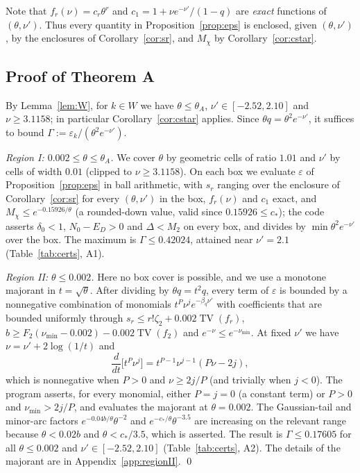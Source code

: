 \documentclass[11pt]{amsart}
\theoremstyle{definition}
\theoremstyle{remark}
\numberwithin{equation}{section}
\newcommand{\TV}{\operatorname{TV}}
\begin{document}
Note that $f_r(\nu)=c_r\theta^r$ and $c_1=1+\nu e^{-\nu'}/(1-q)$ are \emph{exact} functions of $(\theta,\nu')$. Thus every quantity in
Proposition~\ref{prop:eps} is enclosed, given $(\theta,\nu')$, by the enclosures of Corollary~\ref{cor:sr}, and $M_\chi$ by
Corollary~\ref{cor:cstar}.

\subsection{Proof of Theorem A}\label{sec:proofA}
By Lemma~\ref{lem:W}, for $k\in W$ we have $\theta\le\theta_A$, $\nu'\in[-2.52,2.10]$ and $\nu\ge3.1158$; in particular
Corollary~\ref{cor:cstar} applies. Since $\theta q=\theta^2e^{-\nu'}$, it suffices to bound $\Gamma:=\varepsilon_k/(\theta^2e^{-\nu'})$.

\emph{Region I: $0.002\le\theta\le\theta_A$.} We cover $\theta$ by geometric cells of ratio $1.01$ and $\nu'$ by cells of width $0.01$
(clipped to $\nu\ge3.1158$). On each box we evaluate $\varepsilon$ of Proposition~\ref{prop:eps} in ball arithmetic, with $s_r$ ranging over
the enclosure of Corollary~\ref{cor:sr} for every $(\theta,\nu')$ in the box, $f_r(\nu)$ and $c_1$ exact, and
$M_\chi\le e^{-0.15926/\theta}$ (a rounded-down value, valid since $0.15926\le c_\ast$); the code asserts $\delta_0<1$, $N_0-E_D>0$ and $\Delta<M_2$ on every box, and divides by
$\min\theta^2e^{-\nu'}$ over the box. The maximum is $\Gamma\le0.42024$, attained near $\nu'=2.1$ (Table~\ref{tab:certs}, A1).

\emph{Region II: $\theta\le0.002$.} Here no box cover is possible, and we use a monotone majorant in $t=\sqrt\theta$. After dividing by
$\theta q=t^2q$, every term of $\varepsilon$ is bounded by a nonnegative combination of monomials $t^P\nu^je^{-\beta_q\nu'}$ with
coefficients that are bounded uniformly through $s_r\le r!\zeta_2+0.002\TV(f_r)$, $b\ge F_2(\nu_{\min}-0.002)-0.002\TV(f_2)$ and
$e^{-\nu}\le e^{-\nu_{\min}}$. At fixed $\nu'$ we have $\nu=\nu'+2\log(1/t)$ and
\[
  \frac{d}{dt}\bigl[t^P\nu^j\bigr]=t^{P-1}\nu^{j-1}(P\nu-2j),
\]
which is nonnegative when $P>0$ and $\nu\ge2j/P$ (and trivially when $j<0$). The program asserts, for every
monomial, either $P=j=0$ (a constant term) or $P>0$ and $\nu_{\min}>2j/P$, and evaluates the majorant at $\theta=0.002$. The Gaussian-tail and minor-arc factors $e^{-0.04b/\theta}\theta^{-2}$ and
$e^{-c_\ast/\theta}\theta^{-3.5}$ are increasing on the relevant range because $\theta<0.02b$ and $\theta<c_\ast/3.5$, which is asserted. The
result is $\Gamma\le0.17605$ for all $\theta\le0.002$ and $\nu'\in[-2.52,2.10]$ (Table~\ref{tab:certs}, A2). The details of the majorant
are in Appendix~\ref{app:regionII}. \qed
\end{document}
